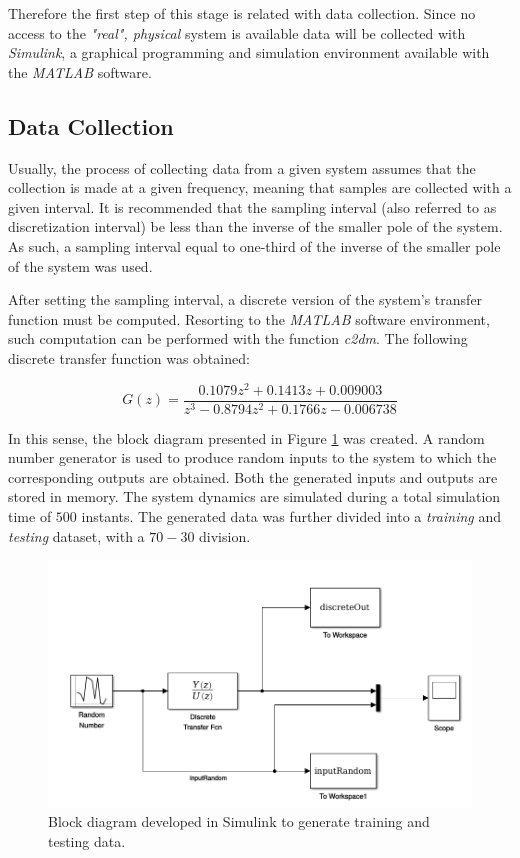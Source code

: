 \documentclass[11pt]{article}
\begin{document}
Therefore the first step of this stage is related with data collection. Since no access to the \emph{"real", physical} system is available data will be collected with \emph{Simulink}, a graphical programming and simulation environment available with the \emph{MATLAB} software.

\subsection{Data Collection}

Usually, the process of collecting data from a given system assumes that the collection is made at a given frequency, meaning that samples are collected with a given interval. It is recommended that the sampling interval (also referred to as discretization interval) be less than the inverse of the smaller pole of the system. As such, a sampling interval equal to one-third of the inverse of the smaller pole of the system was used.

After setting the sampling interval, a discrete version of the system's transfer function must be computed. Resorting to the \emph{MATLAB} software environment, such computation can be performed with the function \emph{c2dm}. The following discrete transfer function was obtained:

$$ G(z) = \frac{0.1079z^{2} + 0.1413z + 0.009003}{z^{3} - 0.8794z^{2} + 0.1766z - 0.006738}$$

In this sense, the block diagram presented in Figure \ref{input_generator_block_diagram} was created. A random number generator is used to produce random inputs to the system to which the corresponding outputs are obtained. Both the generated inputs and outputs are stored in memory. The system dynamics are simulated during a total simulation time of $500$ instants. The generated data was further divided into a \emph{training} and \emph{testing} dataset, with a $70-30$ division.

\begin{figure}[ht]
	\centering
	\includegraphics[scale=0.4]{images/input_generator_block_diagram.png}
	\caption{Block diagram developed in Simulink to generate training and testing data.}
	\label{input_generator_block_diagram}
\end{figure}
\end{document}
